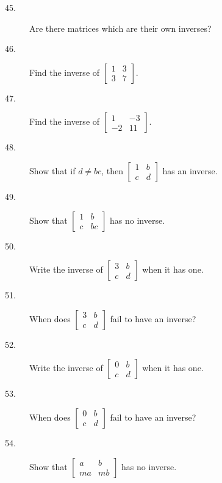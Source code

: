 \documentclass{article}
\begin{document}
\begin{description}
  \item[45.] Are there matrices which are their own inverses? 

  \item[46.] Find the inverse of $\begin{bmatrix} 1 & 3 \\ 3 & 7 \end{bmatrix}$. 

  \item[47.] Find the inverse of $\begin{bmatrix} 1 & -3 \\ -2 & 11 \end{bmatrix}$. 

  \item[48.] Show that if $d \neq bc$, then $\begin{bmatrix} 1 & b \\ c & d \end{bmatrix}$ has an inverse. 

  \item[49.] Show that $\begin{bmatrix} 1 & b \\ c & bc \end{bmatrix}$ has no inverse. 

  \item[50.] Write the inverse of $\begin{bmatrix} 3 & b \\ c & d \end{bmatrix}$ when it has one. 

  \item[51.] When does $\begin{bmatrix} 3 & b \\ c & d \end{bmatrix}$ fail to have an inverse? 

  \item[52.] Write the inverse of $\begin{bmatrix} 0 & b \\ c & d \end{bmatrix}$ when it has one. 

  \item[53.] When does $\begin{bmatrix} 0 & b \\ c & d \end{bmatrix}$ fail to have an inverse? 

  \item[54.] Show that $\begin{bmatrix} a & b \\ ma & mb \end{bmatrix}$ has no inverse. 


\end{description}
\end{document}
